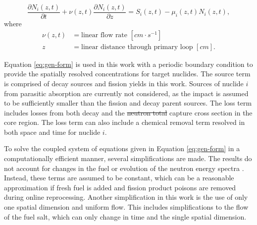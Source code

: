 \documentclass{style/nseJournal}
\providecommand{\DIFadd}[1]{{\protect\color{blue}\uwave{#1}}} %
\providecommand{\DIFdel}[1]{{\protect\color{red}\sout{#1}}}                      %
\providecommand{\DIFaddbegin}{} %
\providecommand{\DIFaddend}{} %
\providecommand{\DIFdelbegin}{} %
\providecommand{\DIFdelend}{} %
\begin{document}
\begin{equation}
    \frac{\partial N_i (z, t)}{\partial t} + \nu(z, t) \frac{\partial N_i (z, t)}{\partial z} = S_i(z, t) - \mu_i(z, t) N_i(z, t),
\label{eq:gen-form}
\end{equation}
where
\begin{align}
    \nu(z, t) &= \text{linear flow rate $[cm \cdot s^{-1}]$} \nonumber \\
    z &= \text{linear distance through primary loop $[cm]$}.
\end{align}

Equation \eqref{eq:gen-form} is used in this work with a periodic boundary condition to provide the spatially resolved concentrations for target nuclides.
The source term is comprised of decay sources and fission yields in this work.
Sources of nuclide $i$ from parasitic absorption are currently not considered, as the impact is assumed to be sufficiently smaller than the fission and decay parent sources.
The loss term includes losses from both decay and the \DIFdelbegin \DIFdel{neutron total }\DIFdelend \DIFaddbegin \DIFadd{total neutron }\DIFaddend capture cross section in the core region.
The loss term can also include a chemical removal term resolved in both space and time for nuclide $i$.


To solve the coupled system of equations given in Equation \eqref{eq:gen-form} in a computationally efficient manner, several simplifications are made. 
The results do not account for changes in the fuel or evolution of the neutron energy spectra \cite{openmc}.
Instead, these terms are assumed to be constant, which can be a reasonable approximation if fresh fuel is added and fission product poisons are removed during online reprocessing.
Another simplification in this work is the use of only one spatial dimension and uniform flow.
This includes simplifications to the flow of the fuel salt, which can only change in time and the single spatial dimension.
\end{document}
